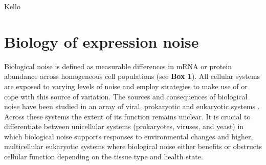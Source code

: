 Kello%

\section{Biology of expression noise} 

Biological noise is defined as measurable differences in \gls{mRNA} or protein abundance across homogeneous cell populations (see \textbf{Box 1}). 
All cellular systems are exposed to varying levels of noise and employ strategies to make use of or cope with this source of variation. 
The sources and consequences of biological noise have been studied in an array of viral, prokaryotic and eukaryotic systems \citep{Raj2010, Balazsi2011, Eldar2010}. 
Across these systems the extent of its function remains unclear. 
It is crucial to differentiate between unicellular systems (prokaryotes, viruses, and yeast) in which biological noise supports responses to environmental changes and higher, multicellular eukaryotic systems where biological noise either benefits or obstructs cellular function depending on the tissue type and health state.\\

